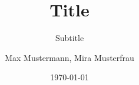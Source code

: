 \author{
	Max Mustermann,
	Mira Musterfrau
}
\titlehead{titlehead}
\subject{Subject}
\title{Title}
\subtitle{Subtitle}
\date{\today}
